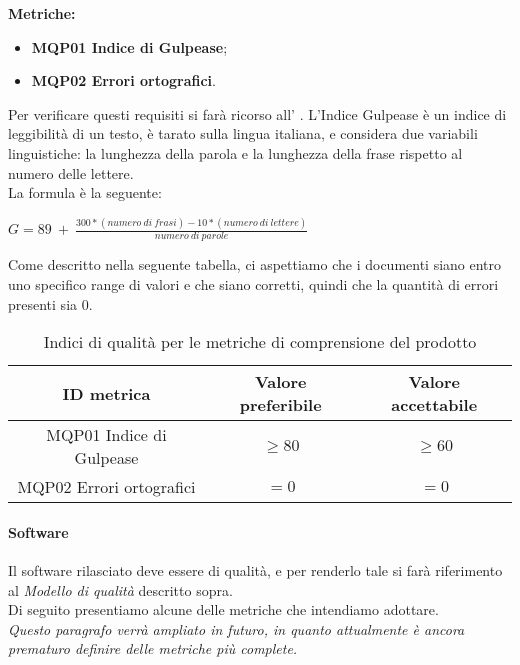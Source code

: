 \documentclass[../piano_di_qualifica.tex]{subfiles}
\begin{document}
\textbf{Metriche:}
\smallbreak
\begin{itemize}
	\item \textbf{MQP01 Indice di Gulpease};
	\item \textbf{MQP02 Errori ortografici}.
\end{itemize}

Per verificare questi requisiti si farà ricorso all’ . L'Indice Gulpease è un indice di leggibilità di un testo, è tarato sulla lingua italiana, e considera due variabili linguistiche: la lunghezza della parola e la lunghezza della frase rispetto al numero delle lettere.\\
La formula è la seguente:\par
\begin{center}
	$G = 89\ +\ \frac{300 * (numero\ di\ frasi) - 10 * (numero\ di\ lettere)}{numero\ di\ parole} $
\end{center}
Come descritto nella seguente tabella, ci aspettiamo che i documenti siano entro uno specifico range di valori e che siano corretti, quindi che la quantità di errori presenti sia 0. \par

\begin{table}[!ht]
	\centering
	\begin{tabular}{|c|c|c|}
		\hline
		\rowcolor{lightgray}
		\textbf{ID metrica}      & \textbf{Valore preferibile} & \textbf{Valore accettabile} \\
		\hline
		MQP01 Indice di Gulpease & \(\ge 80\)                  & \(\ge 60\)                  \\
		\hline
		MQP02 Errori ortografici & \(= 0\)                     & \(= 0\)                     \\
		\hline
	\end{tabular}
	\caption{Indici di qualità per le metriche di comprensione del prodotto}
\end{table}

\paragraph{Software}
Il software rilasciato deve essere di qualità, e per renderlo tale si farà riferimento al \emph{Modello di qualità} descritto sopra. \\
Di seguito presentiamo alcune delle metriche che intendiamo adottare. \\
\emph{Questo paragrafo verrà ampliato in futuro, in quanto attualmente è ancora prematuro definire delle metriche più complete.} \\
\end{document}
